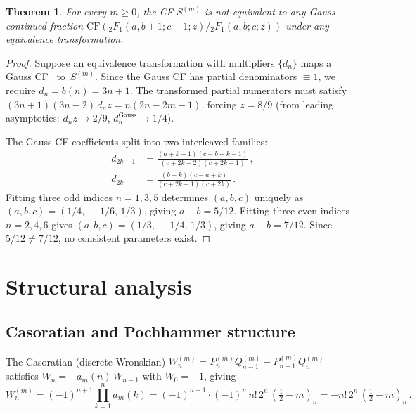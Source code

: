 \documentclass[11pt]{article}
\newcommand{\half}{\tfrac{1}{2}}
\newcommand{\CF}{\mathrm{CF}}
\newtheorem{theorem}{Theorem}[section]
\theoremstyle{definition}
\theoremstyle{remark}
\begin{document}
\begin{theorem}\label{thm:gauss}
For every $m \geq 0$, the CF $S^{(m)}$ is not equivalent to
any Gauss continued fraction
$\CF({}_2F_1(a,b{+}1;c{+}1;z)/{}_2F_1(a,b;c;z))$
under any equivalence transformation.
\end{theorem}

\begin{proof}
Suppose an equivalence transformation with multipliers
$\{d_n\}$ maps a Gauss CF~\cite[\S4.5]{cuyt2008handbook}
to~$S^{(m)}$.
Since the Gauss CF has partial denominators $\equiv 1$,
we require $d_n = b(n) = 3n{+}1$.
The transformed partial numerators must satisfy
$(3n{+}1)(3n{-}2)\,d_n z = n(2n{-}2m{-}1)$,
forcing $z = 8/9$ (from leading asymptotics:
$d_n z \to 2/9$, $d_n^\text{Gauss} \to 1/4$).

The Gauss CF coefficients split into two interleaved families:
\begin{align*}
  d_{2k-1} &= \frac{(a{+}k{-}1)(c{-}b{+}k{-}1)}{(c{+}2k{-}2)(c{+}2k{-}1)}\,,\\
  d_{2k}   &= \frac{(b{+}k)(c{-}a{+}k)}{(c{+}2k{-}1)(c{+}2k)}\,.
\end{align*}
Fitting three odd indices $n=1,3,5$ determines $(a,b,c)$ uniquely as
$(a,b,c) = (1/4,\, {-}1/6,\, 1/3)$, giving $a{-}b = 5/12$.
Fitting three even indices $n=2,4,6$ gives
$(a,b,c) = (1/3,\, {-}1/4,\, 1/3)$, giving $a{-}b = 7/12$.
Since $5/12 \neq 7/12$, no consistent parameters exist.
\end{proof}


\section{Structural analysis}\label{sec:structure}

\subsection{Casoratian and Pochhammer structure}

The Casoratian (discrete Wronskian)
$W_n^{(m)} = P_n^{(m)} Q_{n-1}^{(m)} - P_{n-1}^{(m)} Q_n^{(m)}$
satisfies $W_n = -a_m(n)\,W_{n-1}$ with $W_0 = -1$, giving
\begin{equation}\label{eq:casoratian}
  W_n^{(m)} = (-1)^{n+1}\prod_{k=1}^{n} a_m(k)
  = (-1)^{n+1}\cdot(-1)^n\,n!\,2^n\,(\half{-}m)_n
  = -n!\,2^n\,(\half{-}m)_n\,.
\end{equation}
\end{document}
